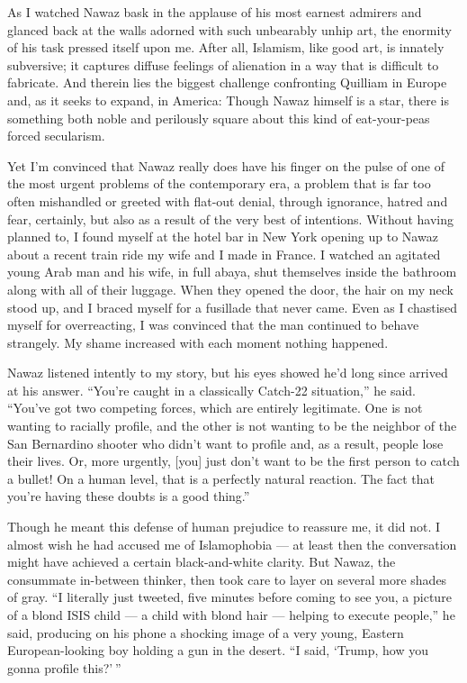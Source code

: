 As I watched Nawaz bask in the applause of his most earnest admirers and
glanced back at the walls adorned with such unbearably unhip art, the
enormity of his task pressed itself upon me. After all, Islamism, like
good art, is innately subversive; it captures diffuse feelings of
alienation in a way that is difficult to fabricate. And therein lies the
biggest challenge confronting Quilliam in Europe and, as it seeks to
expand, in America: Though Nawaz himself is a star, there is something
both noble and perilously square about this kind of eat-your-peas forced
secularism.

Yet I'm convinced that Nawaz really does have his finger on the pulse of
one of the most urgent problems of the contemporary era, a problem that
is far too often mishandled or greeted with flat-out denial, through
ignorance, hatred and fear, certainly, but also as a result of the very
best of intentions. Without having planned to, I found myself at the
hotel bar in New York opening up to Nawaz about a recent train ride my
wife and I made in France. I watched an agitated young Arab man and his
wife, in full abaya, shut themselves inside the bathroom along with all
of their luggage. When they opened the door, the hair on my neck stood
up, and I braced myself for a fusillade that never came. Even as I
chastised myself for overreacting, I was convinced that the man
continued to behave strangely. My shame increased with each moment
nothing happened.

Nawaz listened intently to my story, but his eyes showed he'd long since
arrived at his answer. ``You're caught in a classically Catch-22
situation,'' he said. ``You've got two competing forces, which are
entirely legitimate. One is not wanting to racially profile, and the
other is not wanting to be the neighbor of the San Bernardino shooter
who didn't want to profile and, as a result, people lose their lives.
Or, more urgently, {[}you{]} just don't want to be the first person to
catch a bullet! On a human level, that is a perfectly natural reaction.
The fact that you're having these doubts is a good thing.''

Though he meant this defense of human prejudice to reassure me, it did
not. I almost wish he had accused me of Islamophobia --- at least then
the conversation might have achieved a certain black-and-white clarity.
But Nawaz, the consummate in-between thinker, then took care to layer on
several more shades of gray. ``I literally just tweeted, five minutes
before coming to see you, a picture of a blond ISIS child --- a child
with blond hair --- helping to execute people,'' he said, producing on
his phone a shocking image of a very young, Eastern European-looking boy
holding a gun in the desert. ``I said, `Trump, how you gonna profile
this?' ''

